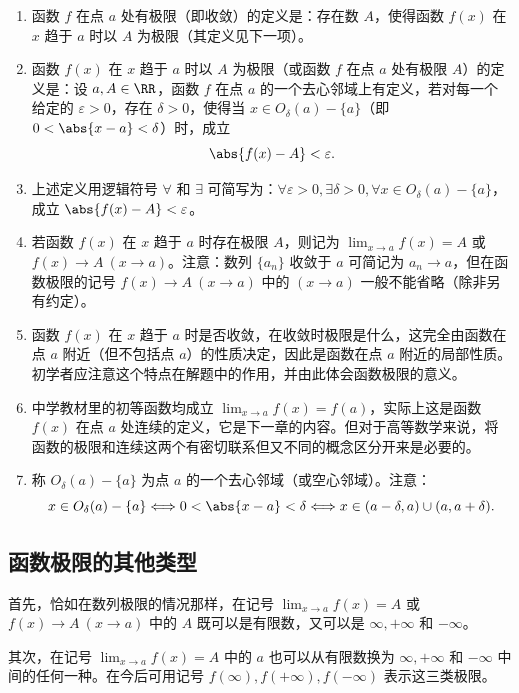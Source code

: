 \begin{enumerate}
  \item 函数 $f$ 在点 $a$ 处有极限（即收敛）的定义是：存在数 $A$，使得函数 $f(x)$ 在 $x$ 趋于 $a$ 时以 $A$ 为极限（其定义见下一项）。
  \item 函数 $f(x)$ 在 $x$ 趋于 $a$ 时以 $A$ 为极限（或函数 $f$ 在点 $a$ 处有极限 $A$）的定义是：设 $a,A\in\RR$，函数 $f$ 在点 $a$ 的一个去心邻域上有定义，若对每一个给定的 $\varepsilon>0$，存在 $\delta>0$，使得当 $x\in O_\delta(a)-\{a\}$（即 $0<\abs{x-a}<\delta$）时，成立
  \[
    \abs{f(x)-A}<\varepsilon.
  \]
  \item 上述定义用逻辑符号 $\forall$ 和 $\exists$ 可简写为：$\forall\varepsilon>0,\exists\delta>0,\forall x\in O_\delta(a)-\{a\}$，成立 $\abs{f(x)-A}<\varepsilon$。
  \item 若函数 $f(x)$ 在 $x$ 趋于 $a$ 时存在极限 $A$，则记为 $\lim_{x\to a}f(x)=A$ 或 $f(x)\to A\ (x\to a)$。注意：数列 $\{a_n\}$ 收敛于 $a$ 可简记为 $a_n\to a$，但在函数极限的记号 $f(x)\to A\ (x\to a)$ 中的 $(x\to a)$ 一般不能省略（除非另有约定）。
  \item 函数 $f(x)$ 在 $x$ 趋于 $a$ 时是否收敛，在收敛时极限是什么，这完全由函数在点 $a$ 附近（但不包括点 $a$）的性质决定，因此是函数在点 $a$ 附近的局部性质。初学者应注意这个特点在解题中的作用，并由此体会函数极限的意义。
  \item 中学教材里的初等函数均成立 $\lim_{x\to a}f(x)=f(a)$，实际上这是函数 $f(x)$ 在点 $a$ 处连续的定义，它是下一章的内容。但对于高等数学来说，将函数的极限和连续这两个有密切联系但又不同的概念区分开来是必要的。
  \item 称 $O_\delta(a)-\{a\}$ 为点 $a$ 的一个去心邻域（或空心邻域）。注意：
  \[
    x\in O_\delta(a)-\{a\}\Longleftrightarrow 0<\abs{x-a}<\delta
    \Longleftrightarrow x\in(a-\delta,a)\cup(a,a+\delta).
  \]
\end{enumerate}

\subsection{函数极限的其他类型}

首先，恰如在数列极限的情况那样，在记号 $\lim_{x\to a}f(x)=A$ 或 $f(x)\to A\ (x\to a)$ 中的 $A$ 既可以是有限数，又可以是 $\infty,+\infty$ 和 $-\infty$。

其次，在记号 $\lim_{x\to a}f(x)=A$ 中的 $a$ 也可以从有限数换为 $\infty,+\infty$ 和 $-\infty$ 中间的任何一种。在今后可用记号 $f(\infty),f(+\infty),f(-\infty)$ 表示这三类极限。


